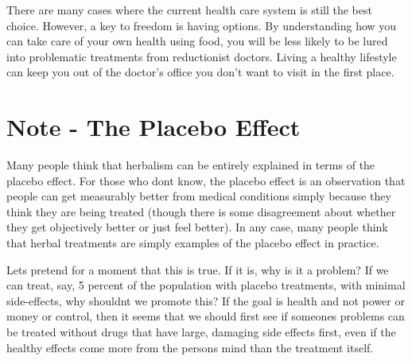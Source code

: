 There are many cases where the current health care system is still the
best choice. However, a key to freedom is having options. By
understanding how you can take care of your own health using food, you
will be less likely to be lured into problematic treatments from
reductionist doctors. 
Living a healthy
lifestyle can keep you out of the doctor’s office you don’t want to
visit in the first place.

\section{Note - The Placebo Effect}

Many people think that herbalism can be entirely explained in terms of
the placebo effect. For those who don{\textquotesingle}t know, the
placebo effect is an observation that people can get measurably better
from medical conditions simply because they think they are being
treated (though there is some disagreement about whether they get
objectively better or just feel better). In any case, many people think
that herbal treatments are simply examples of the placebo effect in
practice. 

Let{\textquotesingle}s pretend for a moment that this is true. If
it is, why is
it a problem?  If we
can treat, say, 5 percent of the population with placebo treatments,
with minimal side-effects, why shouldn{\textquotesingle}t we promote
this?  If the goal is health and not power or money or control, then it
seems that we should first see if someone{\textquotesingle}s problems
can be treated without drugs
that have large,
damaging side effects first, even if the healthy effects come more from
the person{\textquotesingle}s mind than the treatment itself.

